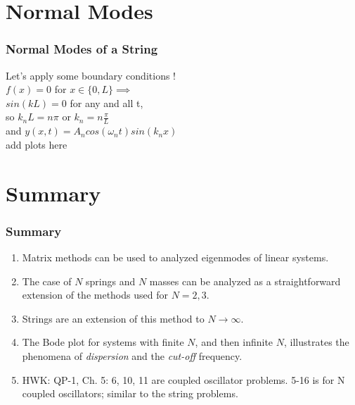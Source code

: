 \documentclass[pdf, hideothersubsections]{beamer}
\begin{document}
\section{Normal Modes}
\begin{frame}
\frametitle{Normal Modes of a String}
\pause
Let's apply some boundary conditions ! \\
\pause
$f(x) = 0$ for $x \in \{0, L\} \implies$ \\
\pause
$sin(k L) = 0$ for any and all t,\\
\pause
so $k_n L = n \pi$ or $k_n = n \frac{\pi}{L}$ \\
\pause
and $y(x, t) = A_n cos(\omega_n t) sin(k_n x)$ \\

add plots here


\end{frame}


\section{Summary}
\begin{frame}
\frametitle{Summary}
\begin{enumerate}

\item Matrix methods can be used to analyzed eigenmodes of linear systems.

\item The case of $N$ springs and $N$ masses can be analyzed as a
  straightforward extension of the methods used for $N = 2, 3$.

\item Strings are an extension of this method to $N \rightarrow \infty$.

\item The Bode plot for systems with finite $N$, and then 
infinite $N$, illustrates the phenomena of \emph{dispersion} and the
\emph{cut-off} frequency.

\item HWK: QP-1, Ch. 5: 6, 10, 11 are coupled oscillator
  problems. 5-16 is for N coupled oscillators; similar to the string problems.

\end{enumerate}
\end{frame}
\end{document}
